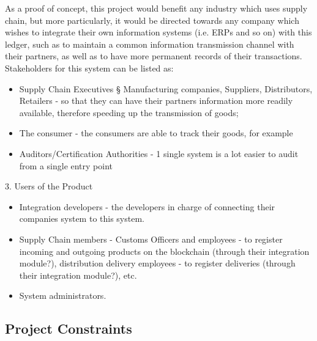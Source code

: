 {	As a proof of concept, this project would benefit any industry which uses supply chain, but more particularly, it would be directed towards any company which wishes to integrate their own information systems (i.e. ERPs and so on) with this ledger, such as to maintain a common information transmission channel with their partners, as well as to have more permanent records of their transactions. Stakeholders for this system can be listed as:
    \begin{itemize}
		\item Supply Chain Executives
			§ Manufacturing companies, Suppliers, Distributors, Retailers - so that they can have their partners information more readily available, therefore speeding up the transmission of goods;
		\item The consumer - the consumers are able to track their goods, for example
		\item Auditors/Certification Authorities - 1 single system is a lot easier to audit from a single entry point
	\end{itemize}
	3. Users of the Product
		\begin{itemize}
		\item Integration developers - the developers in charge of connecting their companies system to this system.
		\item Supply Chain members - Customs Officers and employees - to register incoming and outgoing products on the blockchain (through their integration module?), distribution delivery employees - to register deliveries (through their integration module?), etc.
		\item System administrators.
	\end{itemize}

\subsection{Project Constraints}

}
